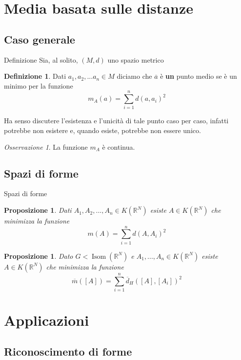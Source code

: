 \documentclass{beamer}
\newcounter{counter1}
\theoremstyle{plain}
\newtheorem{mypro}[counter1]{Proposizione}
\theoremstyle{definition}
\newtheorem{mydef}[counter1]{Definizione}
\theoremstyle{remark}
\newtheorem{myoss}[counter1]{Osservazione}
\newcommand{\obar}[1]{\overline{#1}}
\newcommand{\bra}[1]{\left[#1\right]}
\DeclareMathOperator{\isom}{Isom}
\begin{document}
\section{Media basata sulle distanze}

\subsection{Caso generale}

\begin{frame}{Definizione}
  Sia, al solito, $(M,d)$ uno spazio metrico
  \begin{mydef}
    Dati $a_1,a_2,... a_n \in M$ diciamo che $\obar a$ è \textbf{un}
    punto medio se è un minimo per la funzione
    \[ m_A (a) = \sum _{i = 1} ^n d(a,a_i)^2 \]
  \end{mydef}
  
  Ha senso discutere l'esistenza e l'unicità di tale punto caso per
  caso, infatti potrebbe non esistere e, quando esiste, potrebbe non
  essere unico.

  \begin{myoss}
    La funzione $m_A$ è continua.
  \end{myoss}
\end{frame}

\subsection{Spazi di forme}

\begin{frame}{Spazi di forme}
  \begin{mypro}
    Dati $A_1, A_2,..., A_n \in K(\mathbb{R}^N)$ esiste $A \in
    K(\mathbb{R}^N)$ che minimizza la funzione
    \[ m(A) = \sum _{i =1} ^n d(A,A_i)^2 \]
  \end{mypro}

  \begin{mypro}
    Dato $G < \isom (\mathbb{R}^N)$ e $A_1,...,A_n \in K(\mathbb{R}^N)$
    esiste $A \in K(\mathbb{R}^N)$ che minimizza la funzione 
    \[ \obar m(\bra{A}) = \sum _{i =1} ^n \obar
    d_H(\bra{A},\bra{A_i})^2 \]
  \end{mypro}
\end{frame}


\section{Applicazioni}

\subsection{Riconoscimento di forme}
\end{document}
